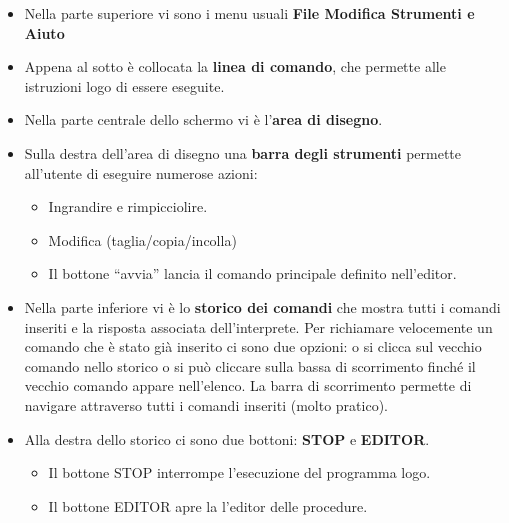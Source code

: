 \begin{itemize}
	\item Nella parte superiore vi sono i menu usuali \textbf{File Modifica Strumenti e Aiuto}
	\item Appena al sotto è collocata la \textbf{linea di comando}, che permette alle istruzioni logo di essere eseguite.
	\item Nella parte centrale dello schermo vi è l'\textbf{area di disegno}. 
	\item Sulla destra dell'area di disegno una \textbf{barra degli strumenti} permette all'utente di eseguire numerose azioni:
	\begin{itemize}
		\item Ingrandire e rimpicciolire.
		\item Modifica (taglia/copia/incolla)
		\item Il bottone ``avvia'' lancia il comando principale definito nell'editor.
	\end{itemize}
	\item Nella parte inferiore vi è lo \textbf{storico dei comandi} che mostra tutti i comandi inseriti e la risposta associata dell'interprete. Per richiamare velocemente un comando che è stato già inserito ci sono due opzioni: o si clicca sul vecchio comando nello storico o si può cliccare sulla bassa di scorrimento finché il vecchio comando appare nell'elenco. La barra di scorrimento permette di navigare attraverso tutti i comandi inseriti (molto pratico). 
	\item Alla destra dello storico ci sono due bottoni: \textbf{STOP} e \textbf{EDITOR}. 
	\begin{itemize}
		\item Il bottone STOP interrompe l'esecuzione del programma logo.
		\item Il bottone EDITOR apre la l'editor delle procedure.\\ 
	\end{itemize}
\end{itemize}
